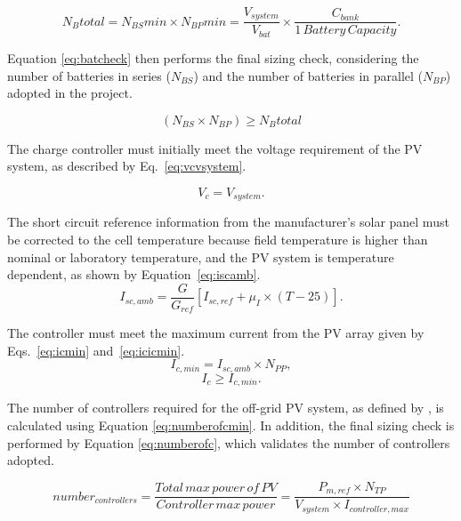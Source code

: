 \begin{equation}
\label{eq:Nbtotal}
N_{B}total = N_{BS}min \times N_{BP}min = \dfrac{V_{system}}{V_{bat}} \times \dfrac{C_{bank}}{1 \,Battery \, Capacity}.
\end{equation}

Equation \ref{eq:batcheck} then performs the final sizing check, considering the number of batteries in series ($ N_{BS} $) and the number of batteries in parallel ($ N_{BP} $) adopted in the project.

\begin{equation}
\label{eq:batcheck}
\left( N_{BS} \times  N_{BP} \right) \geq N_{B}total
\end{equation}

The charge controller must initially meet the voltage requirement of the PV system, as described by Eq.~\eqref{eq:vcvsystem}.
 
\begin{equation}
\label{eq:vcvsystem}
V_{c} = V_{system}.
\end{equation}

The short circuit reference information from the manufacturer's solar panel must be corrected 
to the cell temperature because field temperature is higher than  nominal or laboratory temperature, 
and the PV system is temperature dependent, as shown by Equation~\eqref{eq:iscamb}. 
%
\begin{equation}
\label{eq:iscamb}
I_{sc,amb} = \dfrac{G}{G_{ref}} \left[ I_{sc,ref} + \mu_{I} \times (T-25) \right]. 
\end{equation}

The controller must meet the maximum current from the PV array given by Eqs.~\eqref{eq:icmin} and~\eqref{eq:icicmin}.
%
\begin{equation}
\label{eq:icmin}
I_{c,min} = I_{sc,amb} \times N_{PP},
\end{equation}
%
\begin{equation}
\label{eq:icicmin}
I_{c} \geq I_{c,min}.
\end{equation}

The number of controllers required for the off-grid PV system, as defined by \cite{Yatimi}, is calculated using Equation \ref{eq:numberofcmin}. In addition, the final sizing check is performed by Equation \ref{eq:numberofc}, which validates the number of controllers adopted.

\begin{equation}
\label{eq:numberofcmin}
number_{controllers} = \dfrac{Total \, max \, power \, of \, PV}{Controller \, max \, power} =  \dfrac{P_{m,ref} \times N_{TP}}{V_{system} \times I_{controller,max}}
\end{equation}

